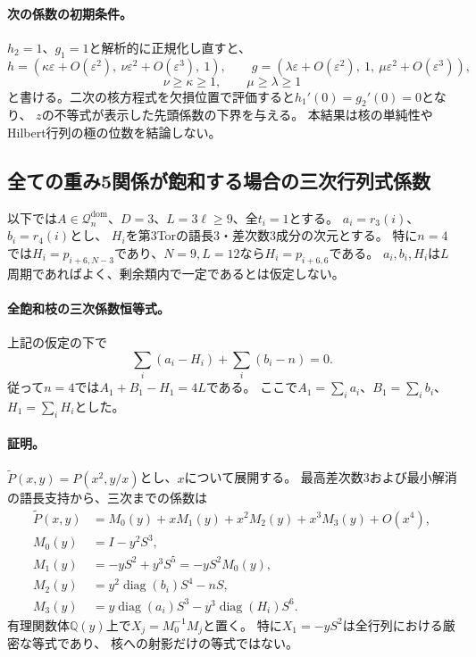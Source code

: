 \documentclass[11pt,a4paper]{ltjsarticle}
\begin{document}
\paragraph{次の係数の初期条件。}
$h_2=1$、$g_1=1$と解析的に正規化し直すと、
\[
 h=(\kappa\varepsilon+O(\varepsilon^2),\ \nu\varepsilon^2+O(\varepsilon^3),\ 1),\qquad
 g=(\lambda\varepsilon+O(\varepsilon^2),\ 1,\ \mu\varepsilon^2+O(\varepsilon^3)),
\]
\[
 \nu\ge\kappa\ge1,\qquad \mu\ge\lambda\ge1
\]
と書ける。二次の核方程式を欠損位置で評価すると$h_1'(0)=g_2'(0)=0$となり、
$z$の不等式が表示した先頭係数の下界を与える。
本結果は核の単純性やHilbert行列の極の位数を結論しない。

\subsection{全ての重み5関係が飽和する場合の三次行列式係数}
\label{note:d3-full-r5-moment}

以下では$A\in\mathcal Q_n^{\mathrm{dom}}$、$D=3$、$L=3\ell\ge9$、全$t_i=1$とする。
$a_i=r_3(i)$、$b_i=r_4(i)$とし、
$H_i$を第3Torの語長3・差次数3成分の次元とする。
特に$n=4$では$H_i=p_{i+6,N-3}$であり、$N=9,L=12$なら$H_i=p_{i+6,6}$である。
$a_i,b_i,H_i$は$L$周期であればよく、剰余類内で一定であるとは仮定しない。

\paragraph{全飽和枝の三次係数恒等式。}
上記の仮定の下で
\[
 \sum_i(a_i-H_i)+\sum_i(b_i-n)=0.
\]
従って$n=4$では$A_1+B_1-H_1=4L$である。
ここで$A_1=\sum_i a_i$、$B_1=\sum_i b_i$、$H_1=\sum_iH_i$とした。
\paragraph{証明。}
$\widetilde P(x,y)=P(x^2,y/x)$とし、$x$について展開する。
最高差次数3および最小解消の語長支持から、三次までの係数は
\begin{align*}
 \widetilde P(x,y)&=M_0(y)+xM_1(y)+x^2M_2(y)+x^3M_3(y)+O(x^4),\\
 M_0(y)&=I-y^2S^3,\\
 M_1(y)&=-yS^2+y^3S^5=-yS^2M_0(y),\\
 M_2(y)&=y^2\operatorname{diag}(b_i)S^4-nS,\\
 M_3(y)&=y\operatorname{diag}(a_i)S^3-y^3\operatorname{diag}(H_i)S^6.
\end{align*}
有理関数体$\mathbb Q(y)$上で$X_j=M_0^{-1}M_j$と置く。
特に$X_1=-yS^2$は全行列における厳密な等式であり、
核への射影だけの等式ではない。
\end{document}
